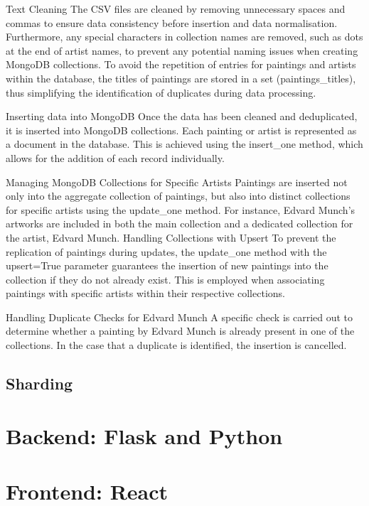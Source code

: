 \documentclass[a4paper,12pt]{article}
\begin{document}
Text Cleaning
The CSV files are cleaned by removing unnecessary spaces and commas to ensure data consistency before insertion and data normalisation. Furthermore, any special characters in collection names are removed, such as dots at the end of artist names, to prevent any potential naming issues when creating MongoDB collections.
To avoid the repetition of entries for paintings and artists within the database, the titles of paintings are stored in a set (paintings_titles), thus simplifying the identification of duplicates during data processing.

Inserting data into MongoDB
Once the data has been cleaned and deduplicated, it is inserted into MongoDB collections. Each painting or artist is represented as a document in the database. This is achieved using the insert_one method, which allows for the addition of each record individually.

Managing MongoDB Collections for Specific Artists
Paintings are inserted not only into the aggregate collection of paintings, but also into distinct collections for specific artists using the update_one method. For instance, Edvard Munch's artworks are included in both the main collection and a dedicated collection for the artist, Edvard Munch.
Handling Collections with Upsert
To prevent the replication of paintings during updates, the update_one method with the upsert=True parameter guarantees the insertion of new paintings into the collection if they do not already exist. This is employed when associating paintings with specific artists within their respective collections.

Handling Duplicate Checks for Edvard Munch
A specific check is carried out to determine whether a painting by Edvard Munch is already present in one of the collections. In the case that a duplicate is identified, the insertion is cancelled.



\subsection{Sharding}
\justify



\newpage
\section{Backend: Flask and Python}
\justify

\newpage

\section{Frontend: React}
\justify
\end{document}
